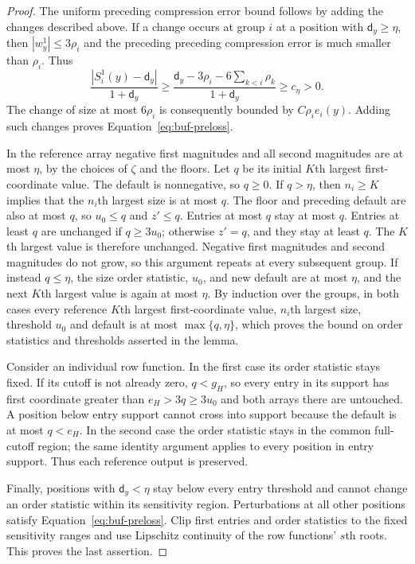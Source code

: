 \begin{proof}
The uniform preceding compression error bound follows by adding the changes described above.
If a change occurs at group $i$ at a position with $\mathsf{d}_y\geq\eta$, then
$|w_y^1|\leq3\rho_i$ and the preceding preceding compression error is much smaller than
$\rho_i$.  Thus
\[
 \frac{|S_i^1(y)-\mathsf{d}_y|}{1+\mathsf{d}_y}
 \geq \frac{\mathsf{d}_y-3\rho_i-6\sum_{k<i}\rho_k}{1+\mathsf{d}_y}
 \geq c_\eta>0.
\]
The change of size at most $6\rho_i$ is consequently bounded by
$C\rho_i e_i(y)$.  Adding such changes proves
Equation~\eqref{eq:buf-preloss}.

In the reference array negative first magnitudes and all second magnitudes
are at most $\eta$, by the choices of $\zeta$ and the floors.
Let $q$ be its initial $K$th largest first-coordinate value.  The default is
nonnegative, so $q\geq0$.  If $q>\eta$, then $n_i\geq K$ implies that the
$n_i$th largest size is at most $q$.  The floor and preceding default are
also at most $q$, so $u_0\leq q$ and $z'\leq q$.  Entries at most $q$
stay at most $q$.  Entries at least $q$ are unchanged if $q\geq3u_0$;
otherwise $z'=q$, and they stay at least $q$.  The $K$th largest value is therefore
unchanged.  Negative first magnitudes and second magnitudes do not grow,
so this argument repeats at every subsequent group.  If instead $q\leq\eta$,
the size order statistic, $u_0$, and new default are at most $\eta$, and the next
$K$th largest value is again at most $\eta$.  By induction over the groups, in
both cases every reference $K$th largest first-coordinate value, $n_i$th largest size,
threshold $u_0$ and default is at most $\max\{q,\eta\}$, which proves
the bound on order statistics and thresholds asserted in the lemma.

Consider an individual row function.  In the first case its order statistic stays
fixed.  If its cutoff is not already zero, $q<g_H$, so every entry in its
support has first coordinate greater than $e_H>3q\geq3u_0$ and both
arrays there are untouched.  A position below entry support cannot
cross into support because the default is at most $q<e_H$.
In the second case the order statistic stays in the common full-cutoff region; the
same identity argument applies to every position in entry support.
Thus each reference output is preserved.

Finally, positions with $\mathsf{d}_y<\eta$ stay below every entry threshold and
cannot change an order statistic within its sensitivity region.  Perturbations at
all other positions satisfy Equation~\eqref{eq:buf-preloss}.  Clip first
entries and order statistics to the fixed sensitivity ranges and use Lipschitz
continuity of the row functions' $s$th roots.  This proves the last assertion.
\end{proof}

